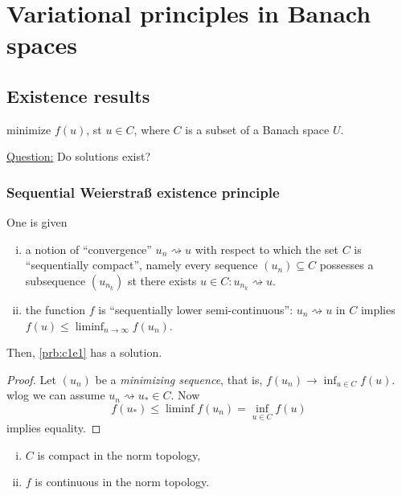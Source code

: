 \documentclass[../skript.tex]{subfiles}
\begin{document}
\chapter{Variational principles in Banach spaces} %
\label{sec:c1}
\section{Existence results} %
\label{sec:c1e2}
\begin{problem} %
\label{prb:c1e1}
minimize $f(u)$, \ac{st} $u \in C$, where $C$ is a subset of a Banach space $U$.
\end{problem}
\underline{Question:} Do solutions exist?
\subsection{Sequential Weierstraß existence principle}
One is given
\begin{enumerate}[(i)]
\item a notion of ``convergence'' $u_n \rightsquigarrow u$ with respect to which the set $C$ is ``sequentially compact'', namely every sequence $(u_n) \subseteq C$ possesses a subsequence $(u_{n_k})$ \ac{st} there exists $u \in C: u_{n_k} \rightsquigarrow u$.
\item the function $f$ is ``sequentially lower semi-continuous'': $u_n \rightsquigarrow u$ in $C$ implies $f(u) \leq \liminf_{n \to \infty} f(u_n)$.
\end{enumerate}
Then, \cref{prb:c1e1} has a solution.
\begin{proof}
Let $(u_n)$ be a \emph{minimizing sequence}, that is, $f(u_n) \to \inf_{u \in C} f(u)$.
\Ac{wlog} we can assume $u_n \rightsquigarrow u_* \in C$.
Now
\[
	f(u_*) \leq \liminf f(u_n) = \inf_{u \in C} f(u)
\]
implies equality.
\end{proof}
\begin{examplenumb} %
\label{ex:c1e1}
\begin{enumerate}[(i)]
\item $C$ is compact in the norm topology,
\item $f$ is continuous in the norm topology.
\end{enumerate}
\end{examplenumb}
\end{document}
